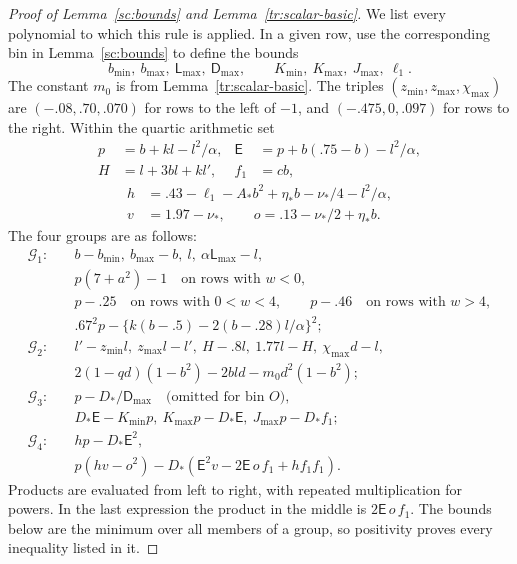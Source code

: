 \documentclass[11pt]{article}
\theoremstyle{definition}
\theoremstyle{remark}
\numberwithin{equation}{section}
\begin{document}
\begin{proof}[Proof of Lemma~\ref{sc:bounds} and Lemma~\ref{tr:scalar-basic}]
We list every polynomial to which this rule is applied. In a given row,
use the corresponding bin in Lemma~\ref{sc:bounds} to define the bounds
\[
 b_{\min},\ b_{\max},\ \mathsf L_{\max},\ \mathsf D_{\max},\qquad
 K_{\min},\ K_{\max},\ J_{\max},\ \ell_1.
\]
The constant $m_0$ is from Lemma~\ref{tr:scalar-basic}.
The triples $(z_{\min},z_{\max},\chi_{\max})$ are
$(-.08,.70,.070)$ for rows to the left of $-1$, and
$(-.475,0,.097)$ for rows to the right. Within the quartic arithmetic set
\[
 \begin{aligned}
 p&=b+kl-l^2/\alpha,&
 \mathsf E&=p+b(.75-b)-l^2/\alpha,\\
 H&=l+3bl+kl',& f_1&=cb,
 \end{aligned}
\]
\[
 \begin{aligned}
 h&=.43-\ell_1-A_*b^2+\eta_*b-\nu_*/4-l^2/\alpha,\\
 v&=1.97-\nu_*,\qquad o=.13-\nu_*/2+\eta_*b.
 \end{aligned}
\]
The four groups are as follows:
\begin{align*}
 \mathcal G_1:\quad& b-b_{\min},\ b_{\max}-b,\ l,\
       \alpha\mathsf L_{\max}-l,\\
 &p(7+a^2)-1\quad\text{on rows with }w<0,\\
 &p-.25\quad\text{on rows with }0<w<4,\qquad
   p-.46\quad\text{on rows with }w>4,\\
 &.67^2p-\{k(b-.5)-2(b-.28)l/\alpha\}^2;\\[1mm]
 \mathcal G_2:\quad& l'-z_{\min}l,\ z_{\max}l-l',\
       H-.8l,\ 1.77l-H,\ \chi_{\max}d-l,\\
 &2(1-qd)(1-b^2)-2bld-m_0d^2(1-b^2);\\[1mm]
 \mathcal G_3:\quad& p-D_*/\mathsf D_{\max}\quad
                         \text{(omitted for bin }O\text{)},\\
 &D_*\mathsf E-K_{\min}p,\ K_{\max}p-D_*\mathsf E,\
       J_{\max}p-D_*f_1;\\[1mm]
 \mathcal G_4:\quad& hp-D_*\mathsf E^2,\\
 &p(hv-o^2)-D_*(\mathsf E^2v-2\mathsf E\,o\,f_1+h f_1 f_1).
\end{align*}
Products are evaluated from left to right, with repeated multiplication
for powers. In the last expression the product in the middle is
$2\mathsf E\,o\,f_1$. The bounds below are the minimum over all members
of a group, so positivity proves every inequality listed in it.


\end{proof}
\end{document}
